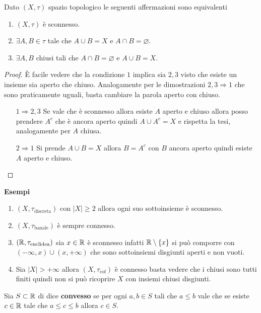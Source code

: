 \begin{theorem}
	Dato $(X, \tau)$ spazio topologico le seguenti affermazioni sono equivalenti 
	\begin{enumerate}
		\item $(X, \tau)$ è sconnesso. 
		\item $\exists A, B \in \tau$ tale che $A \cup B = X$ e $A \cap B = \varnothing$.
		\item $\exists A, B$ chiusi tali che $A\cap B = \varnothing$ e $A \cup B = X$.
	\end{enumerate}
\end{theorem} 
\begin{proof}
	È facile vedere che la condizione $1$ implica sia $2,3$ visto che esiste un insieme sia aperto che chiuso. Analogamente per le dimostrazioni $2,3 \Rightarrow 1$ che sono praticamente uguali, basta cambiare la parola aperto con chiuso. 
	\begin{enumerate}
		\item[$1\Rightarrow 2,3$] Se vale che è sconnesso allora esiste $A$ aperto e chiuso allora posso prendere $A^c$ che è ancora aperto quindi $A\cup A^c = X$ e rispetta la tesi, analogamente per $A$ chiusa. 
		\item[$2 \Rightarrow 1$] Si prende $A \cup B = X$ allora $B = A^c$ con $B$ ancora aperto quindi esiste $A$ aperto e chiuso. 
	\end{enumerate}
\end{proof}

\textbf{Esempi}\\
\begin{enumerate}
	\item $(X, \tau_{\text{discreta}})$ con $|X| \ge 2$ allora ogni suo sottoinsieme è sconnesso. 
	\item $(X, \tau_{\text{banale}})$ è sempre connesso. 
	\item $(\mathbb{R}, \tau_{\text{euclidea}})$ sia $x \in \mathbb{R}$ è sconnesso infatti $\mathbb{R} \setminus \{x\}$ si può comporre con $(-\infty, x) \cup (x, +\infty)$ che sono sottoinsiemi disgiunti aperti e non vuoti. 
	\item Sia $|X| > + \infty$ allora $(X, \tau_{\text{cof}})$ è connesso basta vedere che i chiusi sono tutti finiti quindi non si può ricoprire $X$ con insiemi chiusi disgiunti. 
\end{enumerate}

\begin{definition}
	Sia $S \subset \mathbb{R}$ di dice \textbf{convesso} se per ogni $a, b\in S$ tali che $a \le b$ vale che se esiste $c\in \mathbb{R}$ tale che $a\le c\le b$ allora $c\in S$.
\end{definition} 

